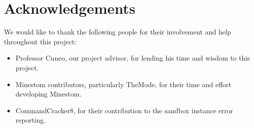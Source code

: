 \documentclass[12pt]{article}
\begin{document}
\newpage %
\section*{Acknowledgements} %
We would like to thank the following people for their involvement and help throughout this project:


\begin{itemize} %
    \item Professor Cuneo, our project advisor, for lending his time and wisdom to this project.
    \item Minestom contributors, particularly TheMode, for their time and effort developing Minestom.
    \item CommandCracker8, for their contribution to the sandbox instance error reporting.
\end{itemize}

\newpage %
\tableofcontents %
\newpage
\listoflistings
\newpage 
\listoffigures %
\end{document}
